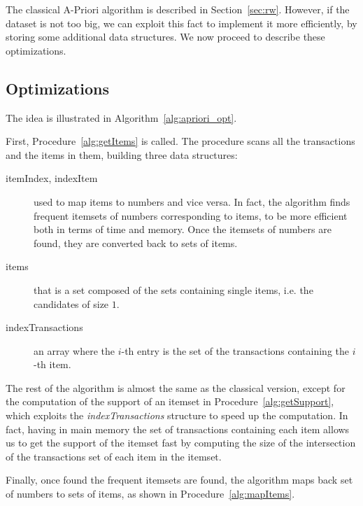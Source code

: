 The classical A-Priori algorithm is described in Section~\ref{sec:rw}.
However, if the dataset is not too big, we can exploit this 
fact to implement it more efficiently, by storing some additional 
data structures. We now proceed to describe these optimizations. 

% 

\subsection{Optimizations}

The idea is illustrated in Algorithm~\ref{alg:apriori_opt}.




First, Procedure~\ref{alg:getItems} is called. The procedure scans all the transactions 
and the items in them, building three data structures:
\begin{description}
    \item[itemIndex, indexItem] used to map items to numbers and vice versa. In fact, 
        the algorithm finds frequent itemsets of numbers corresponding to items, to 
        be more efficient both in terms of time and memory. 
        Once the itemsets of numbers are found, they are converted back to sets of items.  
    \item[items] that is a set composed of the sets containing single items, i.e. the candidates 
        of size $1$. 
    \item[indexTransactions] an array where the $i$-th entry is the set of the transactions 
        containing the $i$-th item.
\end{description}

The rest of the algorithm is almost the same as the classical 
version, except for the computation of the support of an itemset
in Procedure~\ref{alg:getSupport}, 
which exploits the \emph{indexTransactions} structure to speed up the 
computation. In fact, having in main memory the set of transactions 
containing each item allows us to get the support of the 
itemset fast by computing the size of the intersection of the transactions set of
each item in the itemset.

Finally, once found the frequent itemsets are found, the algorithm maps back 
set of numbers to sets of items, as shown in Procedure~\ref{alg:mapItems}.

% 






